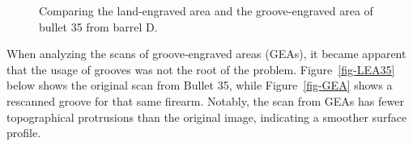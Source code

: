\documentclass[
  number,
  preprint,
  5p,
  twocolumn]{elsarticle}
\begin{document}
\begin{figure}

\begin{minipage}{0.50\linewidth}



\end{minipage}%
%
\begin{minipage}{0.50\linewidth}



\end{minipage}%

\caption{\label{fig-bulletScans}Comparing the land-engraved area and the
groove-engraved area of bullet 35 from barrel D.}

\end{figure}%

When analyzing the scans of groove-engraved areas (GEAs), it became
apparent that the usage of grooves was not the root of the problem.
Figure~\ref{fig-LEA35} below shows the original scan from Bullet 35,
while Figure~\ref{fig-GEA} shows a rescanned groove for that same
firearm. Notably, the scan from GEAs has fewer topographical protrusions
than the original image, indicating a smoother surface profile.
\end{document}
